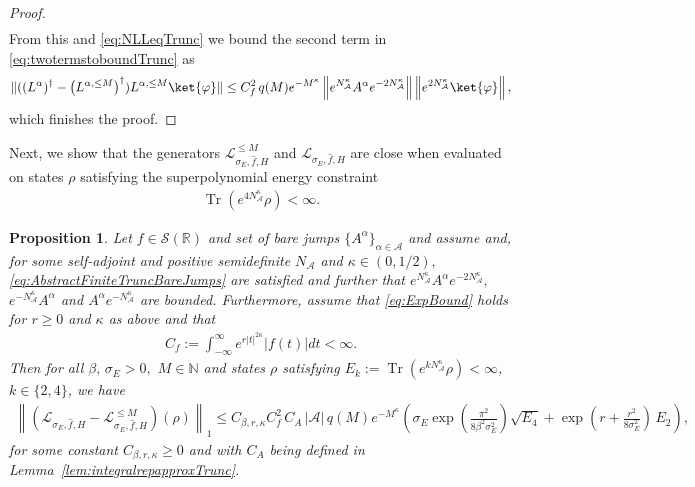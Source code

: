 \documentclass[11pt]{amsart}
\newcommand{\1}{\mathbbm{1}}
\newcommand{\Tr}{\operatorname{Tr}}
\newcommand{\N}{\mathbb{N}}
\newcommand{\NA}{N_{\mathcal{A}}}
\newcommand{\cA}{\mathcal{A}}
\newcommand{\bin}[1]{}
\theoremstyle{plain}
\newtheorem{proposition}[theorem]{Proposition}
\theoremstyle{definition}
\theoremstyle{remark}
\numberwithin{equation}{section}
\begin{document}
\begin{proof}
\begin{align*}
\end{align*}
\bin{where in the second inequality we have used that $\|e^{\NA^{\kappa}}a^{\le M}_ie^{-2\NA^{\kappa}}\|\le 1$ and that by \eqref{eq:ExpBound} we have $\|e^{\NA^{\kappa}}e^{isH}e^{-\NA^{\kappa}}\| \le e^{r|s|/2}.$ } From this 
and \eqref{eq:NLLeqTrunc} we bound the second term in \eqref{eq:twotermstoboundTrunc} as 
\begin{align*}
    \|((L^\alpha)^\dagger-\left(L^{\alpha,\le M}\right)^\dagger)L^{\alpha,\le M}\ket{\varphi}\| \le C^2_f\, q(M)e^{-M^{\kappa}} \left\|e^{\NA^{\kappa}}A^{\alpha}e^{-2\NA^{\kappa}}\right\|\left\|e^{2\NA^{\kappa}}\ket{\varphi}\right\|,
\end{align*}
which finishes the proof.

\end{proof}

Next, we show that the generators $\mathcal{L}^{\le M}_{\sigma_E,\widehat{f},H}$ and $\mathcal{L}_{\sigma_E,\widehat{f},H}$ are close when evaluated on states $\rho$ satisfying the superpolynomial energy constraint 
\begin{align*}
    \Tr\left(e^{4\NA^{\kappa}}\rho\right) <\infty.
\end{align*}

\begin{proposition}\label{prop:generatorboundTrunc}
Let $f\in\mathcal{S}(\mathbb{R})$ and set of bare jumps $\{A^\alpha\}_{\alpha\in\cA}$ and assume   and, for some self-adjoint and positive semidefinite $\NA$ and $\kappa\in(0,1/2),$  \eqref{eq:AbstractFiniteTruncBareJumps}  are satisfied and further that $e^{\NA^\kappa}A^{\alpha}e^{-2\NA^{\kappa}},$ $e^{-\NA^{\kappa}}A^{\alpha}$ and $A^{\alpha}e^{-\NA^{\kappa}}$ are bounded. Furthermore, assume that \eqref{eq:ExpBound} holds for $r\ge 0$ and $\kappa$ as above and that
\begin{align*}
    C_f := \int_{-\infty}^{\infty} e^{r|t|^{2\kappa}}  |f(t)|dt < \infty.
\end{align*}
Then for all $\beta,\,\sigma_E>0,$ $M\in\N$ and states $\rho$ satisfying $E_k:=\Tr(e^{k\NA^{\kappa}}\rho)<\infty$, $k\in\{2,4\}$, we have
\begin{align}
\left\|(\mathcal{L}_{\sigma_E,\widehat{f},H}-\mathcal{L}^{\le M}_{\sigma_E,\widehat{f},H})(\rho)\right\|_1\le C_{\beta,r,\kappa}C^2_f\, C_A \,|\cA| \,q(M)e^{-M^{\kappa}}\left(\sigma_E
\exp\!\left(\tfrac{\pi^2}{8\beta^2\sigma_E^2}\right)\sqrt{E_4}+\exp\left(r+\tfrac{r^2}{8\sigma^2_E}\right)\,E_2\right),
\end{align}
for some constant $C_{\beta,r,\kappa}\ge 0$ and with $C_A$ being defined in Lemma~\ref{lem:integralrepapproxTrunc}.
\end{proposition}
\end{document}
